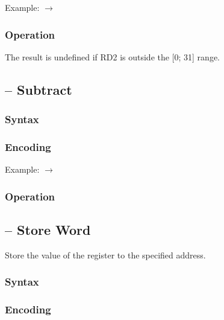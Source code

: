 \documentclass[a4paper,12pt,twoside,extrafontsizes]{memoir}
\begin{document}
{

Example:  $\rightarrow$ 

\subsubsection{Operation}


The result is undefined if RD2 is outside the [0; 31] range.

\subsection{ -- Subtract}
\label{subsec:instr:sub}

\subsubsection{Syntax}


\subsubsection{Encoding}


Example:  $\rightarrow$ 

\subsubsection{Operation}


\subsection{ -- Store Word}
\label{subsec:instr:sw}

Store the value of the register to the specified address.

\subsubsection{Syntax}


\subsubsection{Encoding}

}
\end{document}
